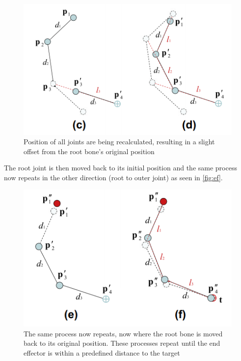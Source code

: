 \begin{figure}[H]
	\centering
	\includegraphics[width=\textwidth]{FABRIK/cd}
	\caption{Position of all joints are being recalculated, resulting in a slight offset from the root bone's original position}
	\label{fig:cd}
\end{figure}

The root joint is then moved back to its initial position and the same process now repeats in the other direction (root to outer joint) as seen in \autoref{fig:ef}.

\begin{figure}[H]
	 \centering
	 \includegraphics[width=\textwidth]{FABRIK/ef}
	 \caption{The same process now repeats, now where the root bone is moved back to its original position. These processes repeat until the end effector is within a predefined distance to the target}
	 \label{fig:ef}
 \end{figure} 

